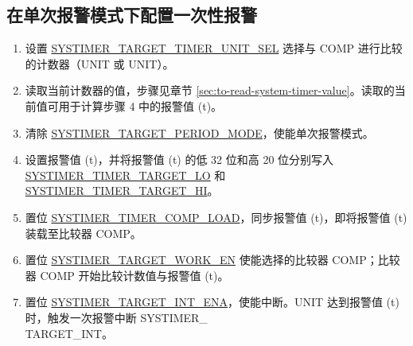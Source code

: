 \documentclass[main\_\_CN.tex]{subfiles}
\begin{document}
\subsection{在单次报警模式下配置一次性报警}
\begin{enumerate}
    \item 设置 \hyperref[fielddesc:SYSTIMERTARGET0TIMERUNITSEL]{SYSTIMER\_TARGET\_TIMER\_UNIT\_SEL} 选择与 COMP 进行比较的计数器（UNIT 或 UNIT）。
    \item 读取当前计数器的值，步骤见章节  \ref{sec:to-read-system-timer-value}。读取的当前值可用于计算步骤 4 中的报警值 (t)。
    \item 清除 \hyperref[fielddesc:SYSTIMERTARGET0PERIODMODE]{SYSTIMER\_TARGET\_PERIOD\_MODE}，使能单次报警模式。
    \item 设置报警值 (t)，并将报警值 (t) 的低 32 位和高 20 位分别写入   \hyperref[fielddesc:SYSTIMERTIMERTARGET0LO]{SYSTIMER\_TIMER\_TARGET\_LO} 和 \hyperref[fielddesc:SYSTIMERTIMERTARGET0HI]{SYSTIMER\_TIMER\_TARGET\_HI}。
    \item 置位 \hyperref[fielddesc:SYSTIMERTIMERCOMP0LOAD]{SYSTIMER\_TIMER\_COMP\_LOAD}，同步报警值 (t)，即将报警值 (t) 装载至比较器 COMP。
    \item 置位 \hyperref[fielddesc:SYSTIMERTARGET0WORKEN]{SYSTIMER\_TARGET\_WORK\_EN} 使能选择的比较器 COMP；比较器 COMP 开始比较计数值与报警值 (t)。
    \item 置位 \hyperref[fielddesc:SYSTIMERTARGET0INTENA]{SYSTIMER\_TARGET\_INT\_ENA}，使能中断。UNIT 达到报警值 (t) 时，触发一次报警中断 SYSTIMER\_\\TARGET{}\_INT。
\end{enumerate}
\end{document}
